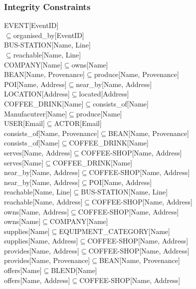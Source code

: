 \subsubsection{Integrity Constraints}
EVENT[EventID]\\$\subseteq$organised\_by[EventID]\\
BUS-STATION[Name,  Line]\\$\subseteq$reachable[Name,  Line]\\
COMPANY[Name]$\subseteq$owns[Name]\\
BEAN[Name,  Provenance]$\subseteq$produce[Name,  Provenance]\\
POI[Name,  Address]$\subseteq$near\_by[Name,  Address]\\
LOCATION[Address]$\subseteq$located[Address]\\
COFFEE\_DRINK[Name]$\subseteq$consists\_of[Name]\\
Manufacutrer[Name]$\subseteq$produce[Name]\\
USER[Email]$\subseteq$ACTOR[Email]\\
consists\_of[Name,  Provenance]$\subseteq$BEAN[Name,  Provenance]\\
consists\_of[Name]$\subseteq$COFFEE\_DRINK[Name]\\
serves[Name,  Address]$\subseteq$COFFEE-SHOP[Name,  Address]\\
serves[Name]$\subseteq$COFFEE\_DRINK[Name]\\
near\_by[Name,  Address]$\subseteq$COFFEE-SHOP[Name,  Address]\\
near\_by[Name,  Address]$\subseteq$POI[Name,  Address]\\
reachable[Name,  Line]$\subseteq$BUS-STATION[Name,  Line]\\
reachable[Name,  Address]$\subseteq$COFFEE-SHOP[Name,  Address]\\
owns[Name,  Address]$\subseteq$COFFEE-SHOP[Name,  Address]\\
owns[Name]$\subseteq$COMPANY[Name]\\
supplies[Name]$\subseteq$EQUIPMENT\_CATEGORY[Name]\\
supplies[Name,  Address]$\subseteq$COFFEE-SHOP[Name,  Address]\\
provides[Name,  Address]$\subseteq$COFFEE-SHOP[Name,  Address]\\
provides[Name,  Provenance]$\subseteq$BEAN[Name,  Provenance]\\
offers[Name]$\subseteq$BLEND[Name]\\
offers[Name,  Address]$\subseteq$COFFEE-SHOP[Name,  Address]\\
